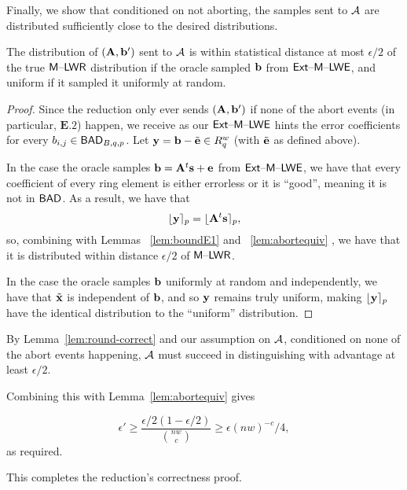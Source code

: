 Finally, we show that conditioned on not aborting, the samples sent to $\mathcal{A}$ are distributed sufficiently close to the desired distributions. 
\begin{lemma}\label{lem:round-correct}
  The distribution of $(\mathbf{A}, \mathbf{b}')$ sent to $\mathcal{A}$ is within
  statistical distance at most $\epsilon/2$ of the true $\mathsf{M \text{\textendash} LWR}$
  distribution if the oracle sampled $\mathbf{b}$ from $\mathsf{Ext \text{\textendash} M \text{\textendash} LWE}$, and
  uniform if it sampled it uniformly at random.\end{lemma}
\begin{proof}
  Since the reduction only ever
  sends $(\mathbf{A},\mathbf{b}')$ if none of the abort events (in particular,
  $\mathbf{E.2}$) happen, we receive as our $\mathsf{Ext \text{\textendash} M \text{\textendash} LWE}$ hints the error
  coefficients for every $b_{i,j} \in \textsf{BAD}_{B,q,p}$.  Let
  $\mathbf{y}=\mathbf{b} - \tilde{\mathbf{e}} \in R_q^{w}$ (with $\tilde{\mathbf{e}}$ as
  defined above). 

  In the case the oracle samples $\mathbf{b}=\mathbf{A}^{t}\mathbf{s}+\mathbf{e}$ from
  $\mathsf{Ext \text{\textendash} M \text{\textendash} LWE}$, we have that every coefficient of every ring element is
  either errorless or it is ``good'', meaning it is not in
  $\textsf{BAD}$. As a result, we have that
\[\lfloor\mathbf{y}\rceil_p=\lfloor\mathbf{A}^{t}\mathbf{s}\rceil_p,\]
so, combining with Lemmas ~\ref{lem:boundE1} and
~\ref{lem:abortequiv} , we have that it is distributed within distance
$\epsilon/2$ of $\mathsf{M \text{\textendash} LWR}$.

In the case the oracle samples $\mathbf{b}$ uniformly at random and
independently, we have that $\tilde{\mathbf{x}}$ is independent of $\mathbf{b}$,
and so $\mathbf{y}$ remains truly uniform, making $\lfloor\mathbf{y}\rceil_p$ have
the identical distribution to the ``uniform'' distribution.
\end{proof}

By Lemma~\ref{lem:round-correct} and our assumption on $\mathcal{A}$,
conditioned on none of the abort events happening, $\mathcal{A}$ must succeed
in distinguishing with advantage at least $\epsilon/2$.

Combining this with Lemma~\ref{lem:abortequiv} gives

\[\epsilon' \geq \frac{\epsilon/2(1-\epsilon/2)}{\binom{nw}{c}} \geq \epsilon(nw)^{-c}/4,\]
as required.\medskip


This completes the reduction's correctness proof.





